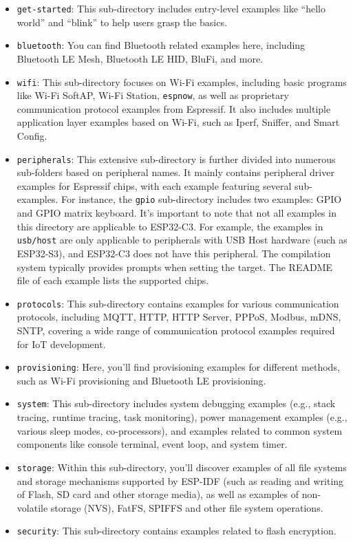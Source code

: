 \documentclass[a4paper,12pt]{book}
\begin{document}
\begin{enumerate}[label=(\arabic*),leftmargin=2em]
\begin{enumerate}[label=\textbf{\alph*.},leftmargin=0em]
        \begin{itemize}[leftmargin=1em]
            \item \verb|get-started|: This sub-directory includes entry-level examples like “hello world” and “blink” to help users grasp the basics.
            \item \verb|bluetooth|: You can find Bluetooth related examples here, including Bluetooth LE Mesh, Bluetooth LE HID, BluFi, and more.
            \item \verb|wifi|: This sub-directory focuses on Wi-Fi examples, including basic programs like Wi-Fi SoftAP, Wi-Fi Station, \verb|espnow|, as well as proprietary communication protocol examples from Espressif. It also includes multiple application layer examples based on Wi-Fi, such as Iperf, Sniffer, and Smart Config.
            \item \verb|peripherals|: This extensive sub-directory is further divided into numerous sub-folders based on peripheral names. It mainly contains peripheral driver examples for Espressif chips, with each example featuring several sub-examples. For instance, the \verb|gpio| sub-directory includes two examples: GPIO and GPIO matrix keyboard. It’s important to note that not all examples in this directory are applicable to ESP32-C3.  For example, the examples in \verb|usb/host| are only applicable to peripherals with USB Host hardware (such as ESP32-S3), and ESP32-C3 does not have this peripheral. The compilation system typically provides prompts when setting the target. The README file of each example lists the supported chips.
            \item \verb|protocols|: This sub-directory contains examples for various communication protocols, including MQTT, HTTP, HTTP Server, PPPoS, Modbus, mDNS, SNTP, covering a wide range of communication protocol examples required for IoT development.
            \item \verb|provisioning|: Here, you’ll find provisioning examples for different methods, such as Wi-Fi provisioning and Bluetooth LE provisioning.
            \item \verb|system|: This sub-directory includes system debugging examples (e.g., stack tracing, runtime tracing, task monitoring), power management examples (e.g., various sleep modes, co-processors), and examples related to common system components like console terminal, event loop, and system timer.
            \item \verb|storage|: Within this sub-directory, you’ll discover examples of all file systems and storage mechanisms supported by ESP-IDF (such as reading and writing of Flash, SD card and other storage media), as well as examples of non-volatile storage (NVS), FatFS, SPIFFS and other file system operations.
            \item \verb|security|: This sub-directory contains examples related to flash encryption.
        \end{itemize}
    \end{enumerate}


\end{enumerate}
\end{document}
